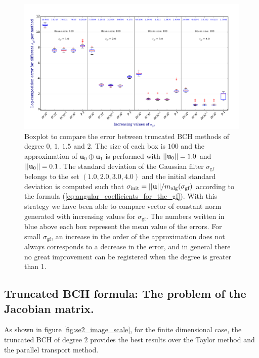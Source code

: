 \begin{figure}[!ht]
	\hspace{-0.5cm}
	\includegraphics[scale=0.5]{figures/SVF_boxplot_comparisons_BCH.pdf}
	\caption{Boxplot to compare the error between truncated BCH methods of degree $0$, $1$, $1.5$ and $2$. The size of each box is $100$ and the approximation of $\mathbf{u}_{0}\oplus \mathbf{u}_1$ is performed with $\vert\lvert \mathbf{u}_{0} \rvert\vert = 1.0$ and $\vert\lvert \mathbf{u}_{0} \rvert\vert = 0.1$. The standard deviation of the Gaussian filter $\sigma_{\text{gf}}$ belongs to the set $(1.0, 2.0, 3.0, 4.0)$ and the initial standard deviation is computed such that $\sigma_{\text{init}} = \vert\lvert \mathbf{u} \rvert\vert/m_{\text{alg}}(\sigma_{\text{gf}})$ according to the formula (\ref{eq:angular_coefficients_for_the_gf}). With this strategy we have been able to compare vector of constant norm generated with increasing values for $\sigma_{\text{gf}}$. The numbers written in blue above each box represent the mean value of the errors. For small $\sigma_{\text{gf}}$, an increase in the order of the approximation does not always corresponds to a decrease in the error, and in general there no great improvement can be registered when the degree is greater than 1. }
	\label{fig:SVF_boxplot_comparisons_BCH}
\end{figure}

\subsection{Truncated BCH formula: The problem of the Jacobian matrix.}\label{se:jacobian_problem}

As shown in figure \ref{fig:se2_image_scale}, for the finite dimensional case, the truncated BCH of degree $2$ provides the best results over the Taylor method and the parallel transport method.

